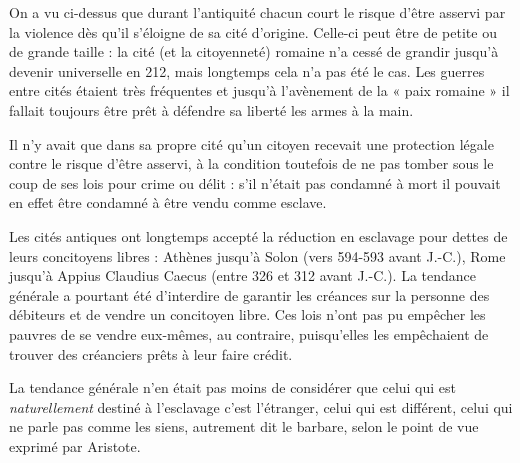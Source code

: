 On a vu ci-dessus que durant l'antiquité chacun court le risque
d'être asservi par la violence dès qu'il s'éloigne de sa cité d'origine. Celle-ci
peut être de petite ou de grande taille : la cité (et la citoyenneté) romaine
n'a cessé de grandir jusqu'à devenir universelle en 212, mais longtemps
cela n'a pas été le cas. Les guerres entre cités étaient très fréquentes
et jusqu'à l'avènement de la « paix romaine » il fallait toujours être prêt
à défendre sa liberté les armes à la main.

Il n'y avait que dans sa propre cité qu'un citoyen recevait une protection
légale contre le risque d'être asservi, à la condition toutefois de ne
pas tomber sous le coup de ses lois pour crime ou délit : s'il n'était pas
condamné à mort il pouvait en effet être condamné à être vendu comme
esclave.

Les cités antiques ont longtemps accepté la réduction en esclavage
pour dettes de leurs concitoyens libres : Athènes jusqu'à \hbox{Solon} (vers
594-593 avant J.-C.), Rome jusqu'à \hbox{Appius} \hbox{Claudius} \hbox{Caecus} (entre 326 et 312
avant J.-C.). La tendance générale
 a pourtant été d'interdire de garantir
les créances sur la personne des débiteurs et de vendre un concitoyen libre.
Ces lois n'ont pas pu empêcher les pauvres de se vendre eux-mêmes,
au contraire, puisqu'elles les empêchaient de trouver des créanciers prêts
à leur faire crédit.

La tendance générale%
n'en était pas moins de considérer que celui
qui est \emph{naturellement} destiné à l'esclavage c'est l'étranger, celui qui est différent,
celui qui ne parle pas comme les siens, autrement dit le barbare, selon
le point de vue exprimé par Aristote.
